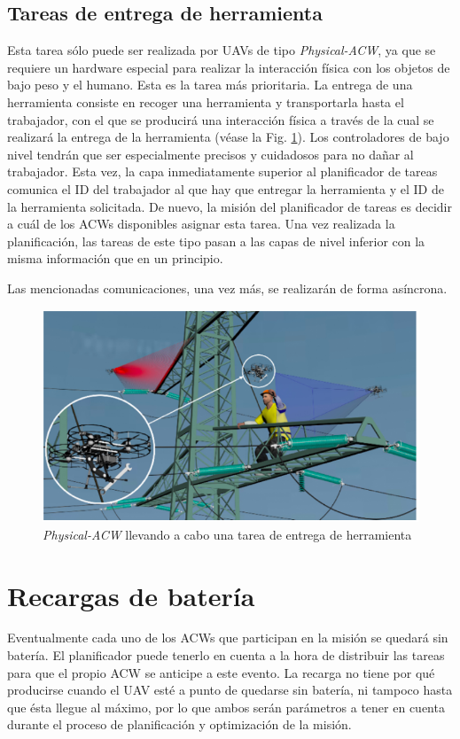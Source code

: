 \documentclass[fontsize=11pt, English=false, Español=true, Myfinal=true, twoside, numbers=noenddot]{scrbook}
\begin{document}
\subsection{Tareas de entrega de herramienta}
\label{subsec:ToolDeliveryTasks}
Esta tarea sólo puede ser realizada por \glspl{UAV} de tipo \textit{Physical-ACW}, ya que se requiere un hardware especial para realizar la interacción física con los objetos de bajo peso y el humano. Esta es la tarea más prioritaria. La entrega de una herramienta consiste en recoger una herramienta y transportarla hasta el trabajador, con el que se producirá una interacción física a través de la cual se realizará la entrega de la herramienta (véase la Fig. \ref{fig:deliver_task}). Los controladores de bajo nivel tendrán que ser especialmente precisos y cuidadosos para no dañar al trabajador. Esta vez, la capa inmediatamente superior al planificador de tareas comunica el \gls{ID} del trabajador al que hay que entregar la herramienta y el \gls{ID} de la herramienta solicitada. De nuevo, la misión del planificador de tareas es decidir a cuál de los \glspl{ACW} disponibles asignar esta tarea. Una vez realizada la planificación, las tareas de este tipo pasan a las capas de nivel inferior con la misma información que en un principio.

Las mencionadas comunicaciones, una vez más, se realizarán de forma asíncrona. 


\begin{figure}[htbp]
    \centering
    \includegraphics[width=0.7\linewidth]
    {ProblemFormulation/figures/deliver_task.png}
    \caption{\textit{Physical-ACW} llevando a cabo una tarea de entrega de herramienta}
    \label{fig:deliver_task}
\end{figure}

\section{Recargas de batería}
\label{sec:BatteryRecharges}
Eventualmente cada uno de los \glspl{ACW} que participan en la misión se quedará sin batería. El planificador puede tenerlo en cuenta a la hora de distribuir las tareas para que el propio \gls{ACW} se anticipe a este evento. La recarga no tiene por qué producirse cuando el \gls{UAV} esté a punto de quedarse sin batería, ni tampoco hasta que ésta llegue al máximo, por lo que ambos serán parámetros a tener en cuenta durante el proceso de planificación y optimización de la misión.
\end{document}
